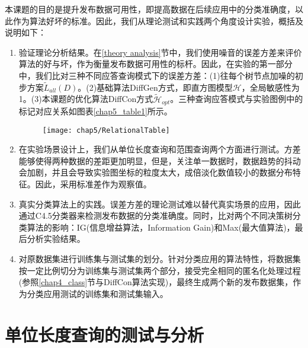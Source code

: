 本课题的目的是提升发布数据可用性，即提高数据在后续应用中的分类准确度，以此作为算法好坏的标准。因此，我们从理论测试和实践两个角度设计实验，概括及说明如下：
\begin{enumerate}
	\item 验证理论分析结果。在\ref{theory analysis}节中，我们使用噪音的误差方差来评价算法的好与坏，作为衡量发布数据可用性的标杆。因此，在实验的第一部分中，我们比对三种不同应答查询模式下的误差方差：(1)往每个树节点加噪的初步方案$\tilde{L}_{all}(D)$。(2)基础算法DiffGen方式，即直方图模型$\mathcal{H}$，全局敏感性为1。(3)本课题的优化算法DiffCon方式$\tilde{\mathcal{H}}_{opt}$。三种查询应答模式与实验图例中的标记对应关系如图表\ref{chap5_table1}所示。
	
	\begin{figure}[!htp]
		\centering
		\texttt{[image: chap5/RelationalTable]}
	\end{figure}
	
	\item 在实验场景设计上，我们从单位长度查询和范围查询两个方面进行测试。方差能够使得两种数据的差距更加明显，但是，关注单一数据时，数据趋势的抖动会加剧，并且会导致实验图坐标的粒度太大，成倍淡化数值较小的数据分布特征。因此，采用标准差作为观察值。
	\item 真实分类算法上的实践。误差方差的理论测试难以替代真实场景的应用，因此通过C4.5分类器\cite{C45}来检测发布数据的分类准确度。同时，比对两个不同决策树分类算法的影响：IG(信息增益算法，Information Gain)和Max\supercite{cart}(最大值算法)，最后分析实验结果。
	\item 对原数据集进行训练集与测试集的划分。针对分类应用的算法特性，将数据集按一定比例切分为训练集与测试集两个部分，接受完全相同的匿名化处理过程(参照\ref{chap4_class}节与DiffCon算法实现)，最终生成两个新的发布数据集，作为分类应用测试的训练集和测试集输入。
\end{enumerate}	

\section{单位长度查询的测试与分析} 

